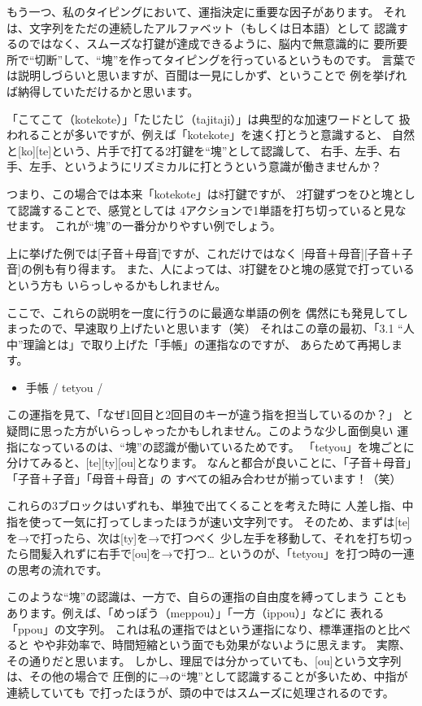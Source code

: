 もう一つ、私のタイピングにおいて、運指決定に重要な因子があります。
それは、文字列をただの連続したアルファベット（もしくは日本語）として
認識するのではなく、スムーズな打鍵が達成できるように、脳内で無意識的に
要所要所で“切断”して、“塊”を作ってタイピングを行っているというものです。
言葉では説明しづらいと思いますが、百聞は一見にしかず、ということで
例を挙げれば納得していただけるかと思います。

「こてこて（kotekote）」「たじたじ（tajitaji）」は典型的な加速ワードとして
扱われることが多いですが、例えば「kotekote」を速く打とうと意識すると、
自然と[ko][te]という、片手で打てる2打鍵を“塊”として認識して、
右手、左手、右手、左手、というようにリズミカルに打とうという意識が働きませんか？

つまり、この場合では本来「kotekote」は8打鍵ですが、
2打鍵ずつをひと塊として認識することで、感覚としては
4アクションで1単語を打ち切っていると見なせます。
これが“塊”の一番分かりやすい例でしょう。

上に挙げた例では[子音＋母音]ですが、これだけではなく
[母音＋母音][子音＋子音]の例も有り得ます。
また、人によっては、3打鍵をひと塊の感覚で打っているという方も
いらっしゃるかもしれません。


ここで、これらの説明を一度に行うのに最適な単語の例を
偶然にも発見してしまったので、早速取り上げたいと思います（笑）
それはこの章の最初、「3.1 “人中”理論とは」で取り上げた「手帳」の運指なのですが、
あらためて再掲します。
\begin{itemize}
 \item 手帳 / tetyou / 
\end{itemize}
この運指を見て、「なぜ1回目と2回目のキーが違う指を担当しているのか？」
と疑問に思った方がいらっしゃったかもしれません。このような少し面倒臭い
運指になっているのは、“塊”の認識が働いているためです。
「tetyou」を塊ごとに分けてみると、[te][ty][ou]となります。
なんと都合が良いことに、「子音＋母音」「子音＋子音」「母音＋母音」の
すべての組み合わせが揃っています！（笑）

これらの3ブロックはいずれも、単独で出てくることを考えた時に
人差し指、中指を使って一気に打ってしまったほうが速い文字列です。
そのため、まずは[te]を→で打ったら、次は[ty]を→で打つべく
少し左手を移動して、それを打ち切ったら間髪入れずに右手で[ou]を→で打つ…
というのが、「tetyou」を打つ時の一連の思考の流れです。


このような“塊”の認識は、一方で、自らの運指の自由度を縛ってしまう
こともあります。例えば、「めっぽう（meppou）」「一方（ippou）」などに
表れる「ppou」の文字列。
これは私の運指ではという運指になり、標準運指のと比べると
やや非効率で、時間短縮という面でも効果がないように思えます。
実際、その通りだと思います。
しかし、理屈では分かっていても、[ou]という文字列は、その他の場合で
圧倒的に→の“塊”として認識することが多いため、中指が連続していても
で打ったほうが、頭の中ではスムーズに処理されるのです。



